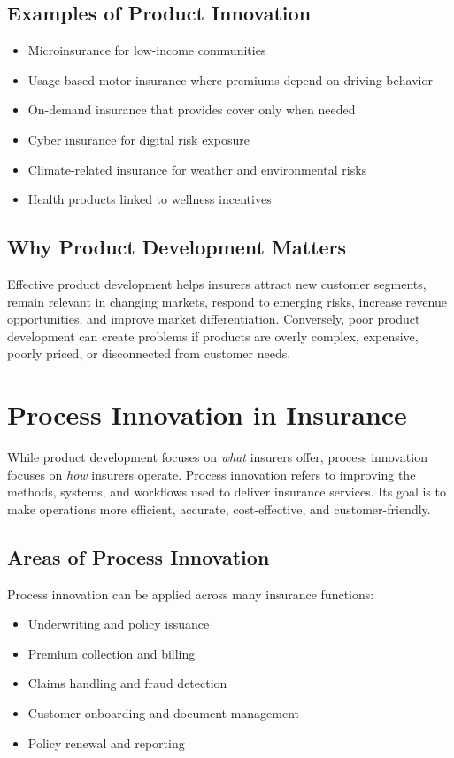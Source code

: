 \documentclass[12pt,a4paper]{article}
\begin{document}
\subsection{Examples of Product Innovation}
\begin{itemize}
    \item Microinsurance for low-income communities
    \item Usage-based motor insurance where premiums depend on driving behavior
    \item On-demand insurance that provides cover only when needed
    \item Cyber insurance for digital risk exposure
    \item Climate-related insurance for weather and environmental risks
    \item Health products linked to wellness incentives
\end{itemize}

\subsection{Why Product Development Matters}
Effective product development helps insurers attract new customer segments, remain relevant in changing markets, respond to emerging risks, increase revenue opportunities, and improve market differentiation. Conversely, poor product development can create problems if products are overly complex, expensive, poorly priced, or disconnected from customer needs.

\section{Process Innovation in Insurance}

While product development focuses on \emph{what} insurers offer, process innovation focuses on \emph{how} insurers operate. Process innovation refers to improving the methods, systems, and workflows used to deliver insurance services. Its goal is to make operations more efficient, accurate, cost-effective, and customer-friendly.

\subsection{Areas of Process Innovation}
Process innovation can be applied across many insurance functions:
\begin{itemize}
    \item Underwriting and policy issuance
    \item Premium collection and billing
    \item Claims handling and fraud detection
    \item Customer onboarding and document management
    \item Policy renewal and reporting
\end{itemize}
\end{document}
